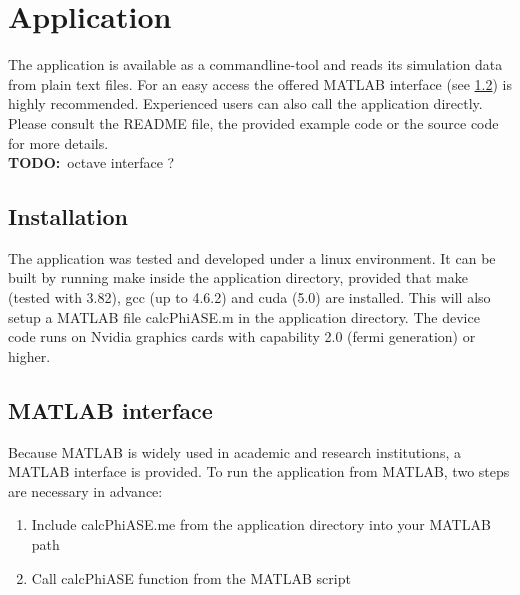 \section{Application}
The application is available as a commandline-tool and reads
its simulation data from plain text files. 
For an easy access the offered MATLAB interface (see \ref{label:matlab_interface}) 
is highly recommended. Experienced users can also call the application
directly. Please consult the README file, the provided 
example code or the source code for more details.\\
\textbf{TODO:}~octave interface ?

\subsection{Installation}
The application was tested and developed under a linux environment.
It can be built by running make inside the application directory, provided
that make (tested with 3.82), gcc (up to 4.6.2) and cuda (5.0) are installed. 
This will also setup a MATLAB file calcPhiASE.m in the application
directory. The device code runs on Nvidia graphics cards with 
capability 2.0 (fermi generation) or higher. 

\subsection{MATLAB interface}
\label{label:matlab_interface}
Because MATLAB is widely used in academic and research institutions, a MATLAB
interface is provided. To run the application from MATLAB, two steps are
necessary in advance:
\begin{enumerate}
  \item Include calcPhiASE.me from the application directory into your MATLAB path
  \item Call calcPhiASE function from the MATLAB script
\end{enumerate}

